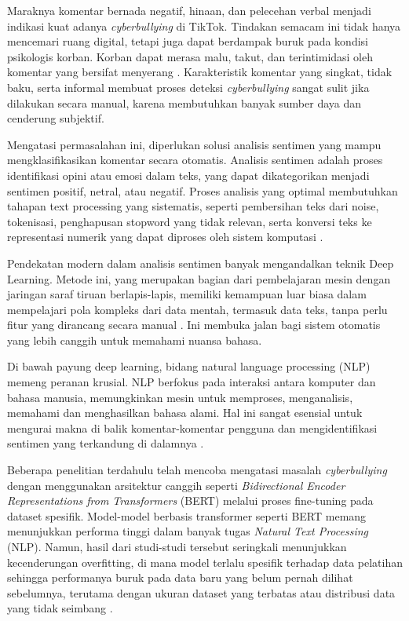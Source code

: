 Maraknya komentar bernada negatif, hinaan, dan pelecehan verbal menjadi indikasi kuat adanya \textit{cyberbullying} di TikTok. Tindakan semacam ini tidak hanya mencemari ruang digital, tetapi juga dapat berdampak buruk pada kondisi psikologis korban. Korban dapat merasa malu, takut, dan terintimidasi oleh komentar yang bersifat menyerang \cite{aser2022fenomena}. Karakteristik komentar yang singkat, tidak baku, serta informal membuat proses deteksi \textit{cyberbullying} sangat sulit jika dilakukan secara manual, karena membutuhkan banyak sumber daya dan cenderung subjektif.

Mengatasi permasalahan ini, diperlukan solusi analisis sentimen yang mampu mengklasifikasikan komentar secara otomatis. Analisis sentimen adalah proses identifikasi opini atau emosi dalam teks, yang dapat dikategorikan menjadi sentimen positif, netral, atau negatif. Proses analisis yang optimal membutuhkan tahapan text processing yang sistematis, seperti pembersihan teks dari noise, tokenisasi, penghapusan stopword yang tidak relevan, serta konversi teks ke representasi numerik yang dapat diproses oleh sistem komputasi \cite{razi2017klasifikasi}.

Pendekatan modern dalam analisis sentimen banyak mengandalkan teknik Deep Learning. Metode ini, yang merupakan bagian dari pembelajaran mesin dengan jaringan saraf tiruan berlapis-lapis, memiliki kemampuan luar biasa dalam mempelajari pola kompleks dari data mentah, termasuk data teks, tanpa perlu fitur yang dirancang secara manual \cite{liao2017cnn}. Ini membuka jalan bagi sistem otomatis yang lebih canggih untuk memahami nuansa bahasa.

Di bawah payung deep learning, bidang natural language processing (NLP) memeng peranan krusial. NLP berfokus pada interaksi antara komputer dan bahasa manusia, memungkinkan mesin untuk memproses, menganalisis, memahami dan menghasilkan bahasa alami. Hal ini sangat esensial untuk mengurai makna di balik komentar-komentar pengguna dan mengidentifikasi sentimen yang terkandung di dalamnya \cite{razi2017klasifikasi}.

Beberapa penelitian terdahulu telah mencoba mengatasi masalah \textit{cyberbullying} dengan menggunakan arsitektur canggih seperti \textit{Bidirectional Encoder Representations from Transformers} (BERT) melalui proses fine-tuning pada dataset spesifik. Model-model berbasis transformer seperti BERT memang menunjukkan performa tinggi dalam banyak tugas \textit{Natural Text Processing} (NLP). Namun, hasil dari studi-studi tersebut seringkali menunjukkan kecenderungan overfitting, di mana model terlalu spesifik terhadap data pelatihan sehingga performanya buruk pada data baru yang belum pernah dilihat sebelumnya, terutama dengan ukuran dataset yang terbatas atau distribusi data yang tidak seimbang \cite{10468424}.

